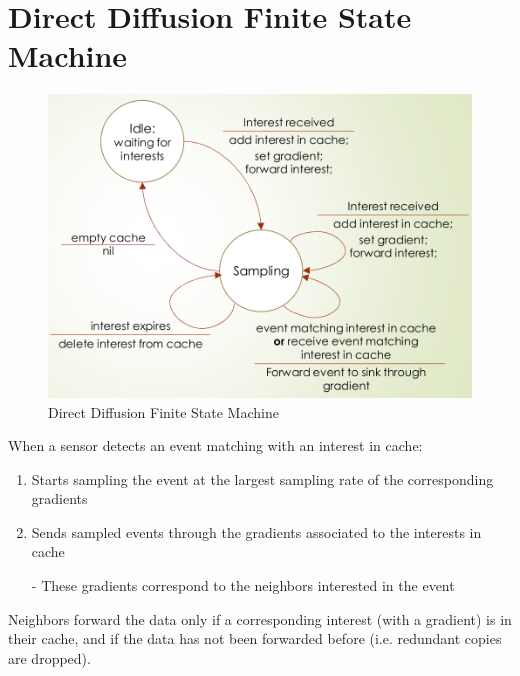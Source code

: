 \section{Direct Diffusion Finite State Machine}
\begin{figure}[htbp]
   \centering
   \includegraphics{images/ddiff_FSM.png}
   \caption{Direct Diffusion Finite State Machine}
   \label{fig:ddiff_FSM}
\end{figure}
When a sensor detects an event matching with an interest in
cache:
\begin{enumerate}
   \item  Starts sampling the event at the largest sampling rate of the corresponding gradients
   \item Sends sampled events through the gradients associated to the interests in cache
   \item[-] These gradients correspond to the neighbors interested in the event
\end{enumerate}
Neighbors forward the data only if a corresponding interest (with a gradient) is in their cache, and if the data has not been forwarded before (i.e. redundant copies are dropped).


